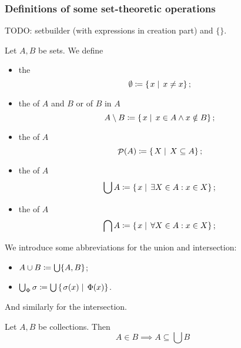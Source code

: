 \subsubsection{Definitions of some set-theoretic operations}
TODO: setbuilder (with expressions in creation part) and $\{\}$.
\begin{definition}
Let $A,B$ be sets. We define
\begin{itemize}
\item the 
\[ \emptyset \coloneqq \left\{\left. x \;\right|\; x\neq x \right\}; \]
\item the  of $A$ and $B$ or  of $B$ in $A$
\[ A\setminus B \coloneqq \left\{\left. x \;\right|\; x\in A \land x\notin B \right\}; \]
\item the  of $A$
\[ \mathop{\mathcal{P}}(A) \coloneqq \left\{\left. X \;\right|\; X\subseteq A \right\}; \]
\item the  of $A$
\[ \bigcup A \coloneqq \left\{\left. x \;\right|\; \exists X\in A: x\in X \right\}; \]
\item the  of $A$
\[ \bigcap A \coloneqq \left\{\left. x \;\right|\; \forall X\in A: x\in X \right\}; \]
\end{itemize}
We introduce some abbreviations for the union and intersection:
\begin{itemize}
\item $A\cup B \coloneqq \bigcup\{A,B\}$;
\item $\bigcup_\Phi \sigma \coloneqq \bigcup\left\{\left. \sigma(x) \;\right|\; \Phi(x) \right\}$.
\end{itemize}
And similarly for the intersection.
\end{definition}

\begin{lemma} \label{lemma:elementSubsetUnion}
Let $A,B$ be collections. Then
\[ A \in B \implies A\subseteq \bigcup B \]
\end{lemma}

